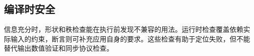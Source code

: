 \subsection*{编译时安全}

信息充分时，形状和秩检查能在执行前发现不兼容的用法。运行时检查覆盖依赖实际输入的约束，断言则可补充应用自身的要求。这些检查有助于定位失败，但不能替代输出数值验证和同步协议检查。

